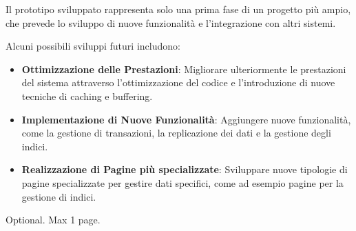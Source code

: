 \documentclass[12pt,a4paper,openright,twoside]{book}
\begin{document}
        Il prototipo sviluppato rappresenta solo una prima fase di un progetto più ampio, che prevede lo sviluppo di nuove funzionalità e l'integrazione con altri sistemi.

        Alcuni possibili sviluppi futuri includono:

        \begin{itemize}
            \item \textbf{Ottimizzazione delle Prestazioni}: Migliorare ulteriormente le prestazioni del sistema attraverso l'ottimizzazione del codice e l'introduzione di nuove tecniche di caching e buffering.
            \item \textbf{Implementazione di Nuove Funzionalità}: Aggiungere nuove funzionalità, come la gestione di transazioni, la replicazione dei dati e la gestione degli indici.
            \item \textbf{Realizzazione di Pagine più specializzate}: Sviluppare nuove tipologie di pagine specializzate per gestire dati specifici, come ad esempio pagine per la gestione di indici.
        \end{itemize}


\backmatter

\nocite{*} %




\begin{acknowledgements} %
Optional. Max 1 page.
\end{acknowledgements}
\end{document}
